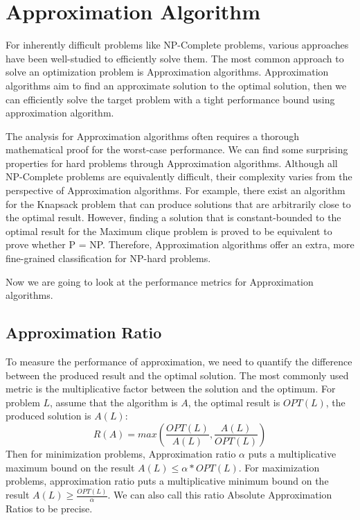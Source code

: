 \documentclass[sigplan,screen,nonacm]{acmart}\settopmatter{printfolios=true,printccs=false,printacmref=false}
\begin{document}
\section{Approximation Algorithm}
For inherently difficult problems like NP-Complete problems, various approaches have been well-studied to efficiently solve them. The most common approach to solve an optimization problem is Approximation algorithms. Approximation algorithms aim to find an approximate solution to the optimal solution, then we can efficiently solve the target problem with a tight performance bound using approximation algorithm.\par
The analysis for Approximation algorithms often requires a thorough mathematical proof for the worst-case performance. We can find some surprising properties for hard problems through Approximation algorithms. Although all NP-Complete problems are equivalently difficult, their complexity varies from the perspective of Approximation algorithms. For example, there exist an algorithm for the Knapsack problem that can produce solutions that are arbitrarily close to the optimal result. However, finding a solution that is constant-bounded to the optimal result for the Maximum clique problem is proved to be equivalent to prove whether P = NP. Therefore, Approximation algorithms offer an extra, more fine-grained classification for NP-hard problems.\par
Now we are going to look at the performance metrics for Approximation algorithms.
\subsection{Approximation Ratio}
To measure the performance of approximation, we need to quantify the difference between the produced result and the optimal solution. The most commonly used metric is the multiplicative factor between the solution and the optimum. For problem $L$, assume that the algorithm is $A$, the optimal result is $OPT(L)$, the produced solution is $A(L)$:
$$R(A) = max(\frac{OPT(L)}{A(L)}, \frac{A(L)}{OPT(L)})$$
Then for minimization problems, Approximation ratio $\alpha$ puts a multiplicative maximum bound on the result $A(L) \leq \alpha*OPT(L)$. For maximization problems, approximation ratio puts a multiplicative minimum bound on the result $A(L) \geq \frac{OPT(L)}{\alpha}$. We can also call this ratio Absolute Approximation Ratios to be precise.
\end{document}
